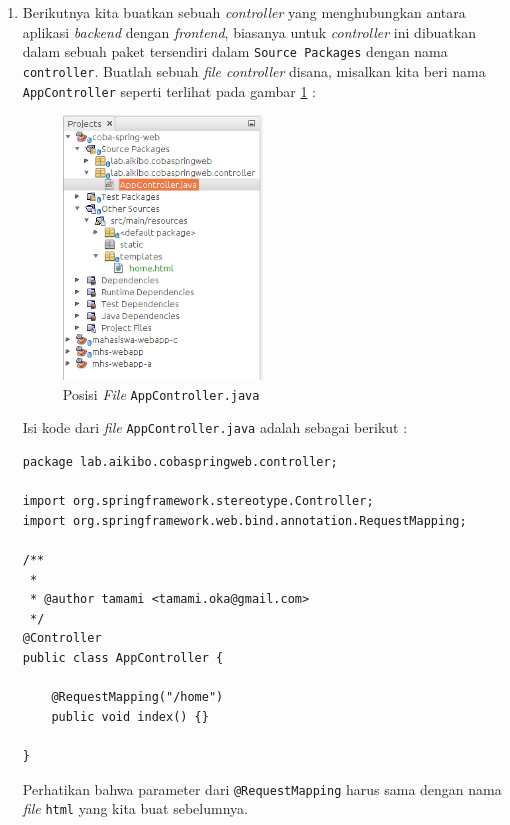 \begin{enumerate}
	\item Berikutnya kita buatkan sebuah \textit{controller} yang menghubungkan antara aplikasi \textit{backend} dengan \textit{frontend}, biasanya untuk \textit{controller} ini dibuatkan dalam sebuah paket tersendiri dalam \texttt{Source Packages} dengan nama \texttt{controller}. Buatlah sebuah \textit{file controller} disana, misalkan kita beri nama \texttt{AppController} seperti terlihat pada gambar \ref{fig:posisi-appcontroller} :
	
	\begin{figure}[H]
		\centering
		\includegraphics[width=0.5\textwidth]{./resources/005-posisi-appcontroller}
		\caption{Posisi \textit{File} \texttt{AppController.java}}
		\label{fig:posisi-appcontroller}
	\end{figure}
	
	Isi kode dari \textit{file} \texttt{AppController.java} adalah sebagai berikut :
	
	\begin{lstlisting}
package lab.aikibo.cobaspringweb.controller;

import org.springframework.stereotype.Controller;
import org.springframework.web.bind.annotation.RequestMapping;

/**
 *
 * @author tamami <tamami.oka@gmail.com>
 */
@Controller
public class AppController {
    
    @RequestMapping("/home")
    public void index() {}
    
}
	\end{lstlisting}

	Perhatikan bahwa parameter dari \texttt{@RequestMapping} harus sama dengan nama \textit{file} \texttt{html} yang kita buat sebelumnya.


\end{enumerate}
